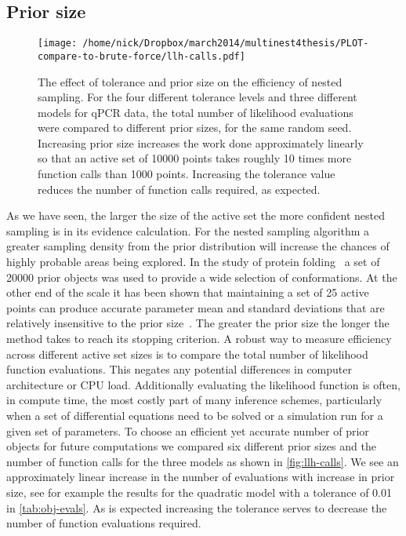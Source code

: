\subsection{Prior size}
\begin{figure*}[p]
\texttt{[image: /home/nick/Dropbox/march2014/multinest4thesis/PLOT-compare-to-brute-force/llh-calls.pdf]}
\caption{The effect of tolerance and prior size on the efficiency of nested sampling.
For the four different tolerance levels and three different models for qPCR data, the total number of likelihood evaluations were compared to different prior sizes, for the same random seed.
Increasing prior size increases the work done approximately linearly so that an active set of 10000 points takes roughly 10 times more function calls than 1000 points.
Increasing the tolerance value reduces the number of function calls required, as expected.
}
\label{fig:llh-calls}
\end{figure*}
As we have seen, the larger the size of the active set the more confident nested sampling is in its evidence calculation.
For the nested sampling algorithm a greater sampling density from the prior distribution will increase the chances of highly probable areas being explored. 
In the study of protein folding~\cite{burkoff2012} a set of 20000 prior objects was used to provide a wide selection of conformations. 
At the other end of the scale it has been shown that maintaining a set of 25 active points can produce accurate parameter mean and standard deviations that are relatively insensitive to the prior size~\cite{aitken2013}.
The greater the prior size the longer the method takes to reach its stopping criterion.
A robust way to measure efficiency across different active set sizes is to compare the total number of likelihood function evaluations.
This negates any potential differences in computer architecture or CPU load.
Additionally evaluating the likelihood function is often, in compute time, the most costly part of many inference schemes, particularly when a set of differential equations need to be solved or a simulation run for a given set of parameters.
To choose an efficient yet accurate number of prior objects for future computations we compared six different prior sizes and the number of function calls for the three models as shown in \autoref{fig:llh-calls}.
We see an approximately linear increase in the number of evaluations with increase in prior size, see for example the results for the quadratic model with a tolerance of 0.01 in \autoref{tab:obj-evals}.
As is expected increasing the tolerance serves to decrease the number of function evaluations required.

